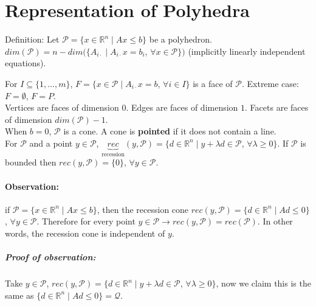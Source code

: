 \documentclass[main]{subfiles}
\begin{document}

\section{Representation of Polyhedra}
Definition: Let $\mathcal{P} = \{x \in \mathbb{R}^n \mid Ax \leq b\}$ be a 
polyhedron. $dim(\mathcal{P}) = n - dim(\{A_{i\cdot} \mid A_{i\cdot}x = b_i$, $
\forall x \in \mathcal{P} \})$ (implicitly linearly independent equations).

For $I \subseteq \{1, \dots, m\}$, $F = \{ x \in \mathcal{P} \mid A_{i\cdot}
x = b$, $\forall i \in I \}$ is a face of $\mathcal{P}$.
Extreme case: $F = \emptyset$, $F = P$.\\

Vertices are faces of dimension $0$. Edges are faces of dimension $1$. Facets 
are faces of dimension $dim(\mathcal{P})-1$.\\

When $b = 0$, $\mathcal{P}$ is a cone. A cone is \textbf{pointed} if it does 
not contain a line.\\

For $\mathcal{P}$ and a point $y \in \mathcal{P}$, $\underbrace{rec}
_{\text{recession}}(y, \mathcal{P}) = \{ d \in \mathbb{R}^n \mid y + \lambda d 
\in \mathcal{P}$, $\forall \lambda \geq 0 \}$. If $\mathcal{P}$ is bounded then 
$rec(y, \mathcal{P}) = \{ 0 \}$, $\forall y \in \mathcal{P}$. \\

\paragraph{Observation:}
if $\mathcal{P} = \{x \in \mathbb{R}^n \mid Ax \leq b \}$, then the recession
cone $rec(y, \mathcal{P}) = \{d \in \mathbb{R}^n \mid Ad \leq 0 \}$, $\forall y
\in \mathcal{P}$. Therefore for every point $y \in \mathcal{P} \rightarrow
rec(y, \mathcal{P}) = rec(\mathcal{P})$. In other words, the recession cone is
independent of $y$.

\subparagraph{Proof of observation:}
Take $y \in \mathcal{P}$, $rec(y, \mathcal{P}) = \{d \in \mathbb{R}^n \mid y +
\lambda d \in \mathcal{P}$, $\forall \lambda \geq 0 \}$, now we claim this is
the same as $\{d \in \mathbb{R}^n \mid Ad \leq 0 \} = \mathcal{Q}$.\\
\end{document}
